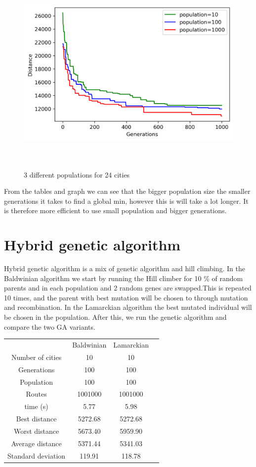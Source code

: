 \documentclass[a4paper,12pt]{article}
\begin{document}
\begin{figure}[H]
\centerline{\includegraphics[width=6in, height=4in]{genetic1.png}}
\caption{3 different populations for 24 cities}
\label{fig}
\end{figure}

From the tables and graph we can see that the bigger population size the smaller generations it takes to find a global min, however this is will take a lot longer. It is therefore more efficient to use small population and bigger generations.

\section{Hybrid genetic algorithm}
Hybrid genetic algorithm is a mix of genetic algorithm and hill climbing. In the Baldwinian algorithm we start by running the Hill climber for 10 $\%$ of random parents and in each population and 2 random genes are swapped.This is repeated 10 times, and the parent with best mutation will be chosen to through mutation and recombination. In the Lamarckian algorithm the best mutated individual will be chosen in the population. After this, we run the genetic algorithm and compare the two GA variants.

\begin{center}
\begin{tabular}{ c c c c}
& Baldwinian & Lamarckian \\ 
Number of cities & 10 &10\\ 
Generations & 100 &100\\ 
Population & 100&100 \\  
Routes    &1001000 &1001000 \\
 time (s) &  5.77 & 5.98\\  
 Best distance & 5272.68 & 5272.68 \\ 
 Worst distance & 5673.40 & 5959.90 \\ 
 Average distance  & 5371.44 & 5341.03 \\ 
 Standard deviation  & 119.91 &118.78 
\end{tabular}
\end{center}
\end{document}
